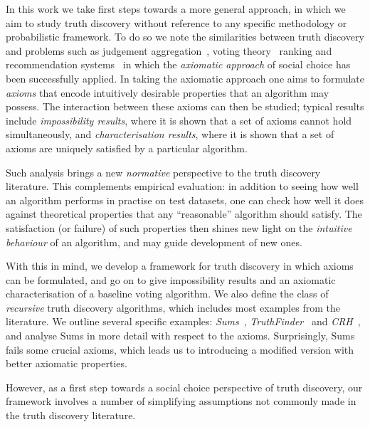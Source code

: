 In this work we take first steps towards a more general approach, in which we
aim to study truth discovery without reference to any specific methodology or
probabilistic framework. To do so we note the similarities between truth
discovery and problems such as judgement aggregation~\cite{endriss2016ja},
voting theory~\cite{zwicker2016voting} ranking and recommendation
systems~\cite{altman2008,altman2005ranking,andersen2008,tennenholtz2004} in
which the \emph{axiomatic approach} of social choice has been successfully
applied.
%
In taking the axiomatic approach one aims to formulate \emph{axioms} that
encode intuitively desirable properties that an algorithm may possess. The
interaction between these axioms can then be studied; typical results include
\emph{impossibility results}, where it is shown that a set of axioms cannot
hold simultaneously, and \emph{characterisation results}, where it is shown
that a set of axioms are uniquely satisfied by a particular algorithm.

Such analysis brings a new \emph{normative} perspective to the truth discovery
literature. This complements empirical evaluation: in addition to seeing how
well an algorithm performs in practise on test datasets, one can check how well
it does against theoretical properties that any ``reasonable'' algorithm should
satisfy. The satisfaction (or failure) of such properties then shines new light
on the \emph{intuitive behaviour} of an algorithm, and may guide development of
new ones.

With this in mind, we develop a framework for truth discovery in
which axioms can be formulated, and go on to give impossibility results and an
axiomatic characterisation of a baseline voting algorithm. We also define the
class of \emph{recursive} truth discovery algorithms, which includes most
examples from the literature. We outline several specific examples:
\emph{Sums}~\cite{pasternack2010},
\emph{TruthFinder}~\cite{yin2008} and \emph{CRH}~\cite{li2016}, and
analyse Sums in more detail with respect to the axioms. Surprisingly, Sums
fails some crucial axioms, which leads us to introducing a modified version
with better axiomatic properties.

However, as a first step towards a social choice perspective of truth
discovery, our framework involves a number of simplifying assumptions not
commonly made in the truth discovery literature.

